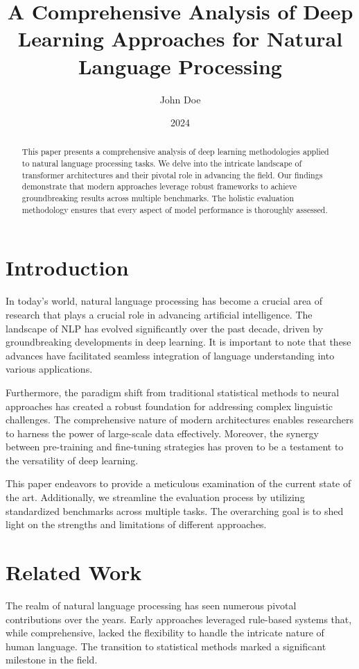 \documentclass{article}
\title{A Comprehensive Analysis of Deep Learning Approaches for Natural Language Processing}
\author{John Doe}
\date{2024}
\begin{document}
\maketitle

\begin{abstract}
This paper presents a comprehensive analysis of deep learning methodologies applied to natural language processing tasks. We delve into the intricate landscape of transformer architectures and their pivotal role in advancing the field. Our findings demonstrate that modern approaches leverage robust frameworks to achieve groundbreaking results across multiple benchmarks. The holistic evaluation methodology ensures that every aspect of model performance is thoroughly assessed.
\end{abstract}

\section{Introduction}

In today's world, natural language processing has become a crucial area of research that plays a crucial role in advancing artificial intelligence. The landscape of NLP has evolved significantly over the past decade, driven by groundbreaking developments in deep learning. It is important to note that these advances have facilitated seamless integration of language understanding into various applications.

Furthermore, the paradigm shift from traditional statistical methods to neural approaches has created a robust foundation for addressing complex linguistic challenges. The comprehensive nature of modern architectures enables researchers to harness the power of large-scale data effectively. Moreover, the synergy between pre-training and fine-tuning strategies has proven to be a testament to the versatility of deep learning.

This paper endeavors to provide a meticulous examination of the current state of the art. Additionally, we streamline the evaluation process by utilizing standardized benchmarks across multiple tasks. The overarching goal is to shed light on the strengths and limitations of different approaches.

\section{Related Work}

The realm of natural language processing has seen numerous pivotal contributions over the years. Early approaches leveraged rule-based systems that, while comprehensive, lacked the flexibility to handle the intricate nature of human language. The transition to statistical methods marked a significant milestone in the field.
\end{document}
